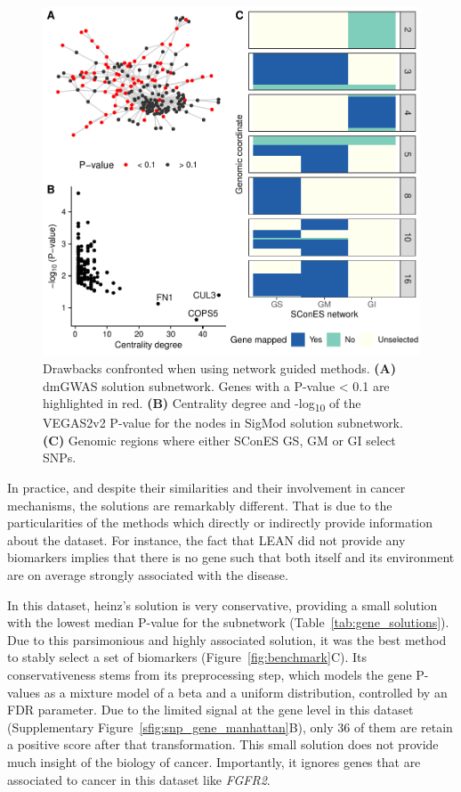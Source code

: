 \documentclass[twocolumn, 11pt]{article}
\begin{document}
\begin{figure}[htbp]
\centering
\includegraphics[width=.8\linewidth]{./figures/figure_2.pdf}
\caption{\label{fig:issues}
Drawbacks confronted when using network guided methods. \textbf{(A)} dmGWAS solution subnetwork. Genes with a P-value < 0.1 are highlighted in red. \textbf{(B)} Centrality degree and -log\textsubscript{10} of the VEGAS2v2 P-value for the nodes in SigMod solution subnetwork. \textbf{(C)} Genomic regions where either SConES GS, GM or GI select SNPs.}
\end{figure}

In practice, and despite their similarities and their involvement in cancer mechanisms, the solutions are remarkably different. That is due to the particularities of the methods which directly or indirectly provide information about the dataset. For instance, the fact that LEAN did not provide any biomarkers implies that there is no gene such that both itself and its environment are on average strongly associated with the disease. 

In this dataset, heinz's solution is very conservative, providing a small solution with the lowest median P-value for the subnetwork (Table~\ref{tab:gene_solutions}). Due to this parsimonious and highly associated solution, it was the best method to stably select a set of biomarkers (Figure~\ref{fig:benchmark}C). Its conservativeness stems from its preprocessing step, which models the gene P-values as a mixture model of a beta and a uniform distribution, controlled by an FDR parameter. Due to the limited signal at the gene level in this dataset (Supplementary Figure~\ref{sfig:snp_gene_manhattan}B), only 36 of them are retain a positive score after that transformation. This small solution does not provide much insight of the biology of cancer. Importantly, it ignores genes that are associated to cancer in this dataset like \emph{FGFR2}. 
\end{document}
